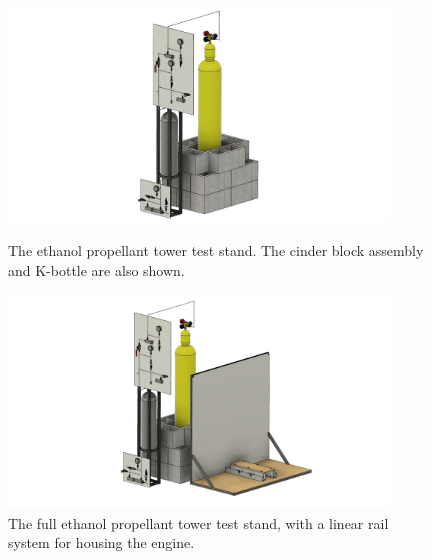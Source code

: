 \documentclass[9pt]{article} %
\numberwithin{equation}{section} %
\begin{document}
\begin{figure}
    \centering
    \begin{minipage}{0.49\textwidth}
        \centering
        \includegraphics[scale=0.5, width=0.9\textwidth, trim={5cm 0cm 5cm 0cm}, clip]{system_cad_files/master_stand_no_engine.png} %
        \caption{The ethanol propellant tower test stand. The cinder block assembly and K-bottle are also shown.}
        \label{fig:master_stand_no_engine}
    \end{minipage}\hfill
    \begin{minipage}{0.49\textwidth}
        \centering
        \includegraphics[scale=0.5, width=0.9\textwidth, trim={5cm 0cm 5cm 0cm}, clip]{system_cad_files/master_stand_v42.png} %
        \caption{The full ethanol propellant tower test stand, with a linear rail system for housing the engine.}
        \label{fig:master_stand}
    \end{minipage}
\end{figure} 
\end{document}
